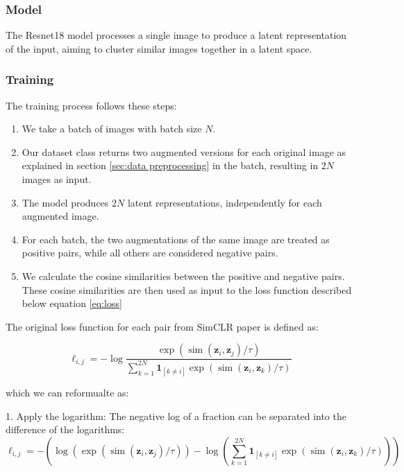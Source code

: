 \subsubsection{Model}
The Resnet18 \cite{he2015deepresiduallearningimage} model processes a single image to produce a latent representation of the input, aiming to cluster similar images together in a latent space. 

\subsubsection{Training }
The training process follows these steps:

\begin{enumerate}
    \item We take a batch of images with batch size $N$.
    
    \item Our dataset class returns two augmented versions for each original image as explained in section \ref{sec:data preprocessing} in the batch, resulting in $2N$ images as input.

    \item The model produces $2N$ latent representations, independently for each augmented image.

    \item For each batch, the two augmentations of the same image are treated as positive pairs, while all others are considered negative pairs.

    \item We calculate the cosine similarities between the positive and negative pairs. These cosine similarities are then used as input to the loss function described below equation \ref{eq:loss}
\end{enumerate}
The original loss function for each pair from SimCLR paper \cite{chen2020simple} is defined as:

\begin{equation}
\ell_{i, j} = -\log \frac{\exp \left(\operatorname{sim}\left(\boldsymbol{z}_i, \boldsymbol{z}_j\right) / \tau\right)}{\sum_{k=1}^{2 N} \mathbf{1}_{[k \neq i]} \exp \left(\operatorname{sim}\left(\boldsymbol{z}_i, \boldsymbol{z}_k\right) / \tau\right)}
\label{eq:original}
\end{equation}
  
which we can reformualte as:

1. Apply the logarithm: The negative log of a fraction can be separated into the difference of the logarithms:
\[
\ell_{i, j} = -\left( \log \left(\exp \left(\operatorname{sim}\left(\boldsymbol{z}_i, \boldsymbol{z}_j\right) / \tau\right)\right) - \log\left( \sum_{k=1}^{2 N} \mathbf{1}_{[k \neq i]} \exp \left(\operatorname{sim}\left(\boldsymbol{z}_i, \boldsymbol{z}_k\right) / \tau\right) \right) \right)
\]

